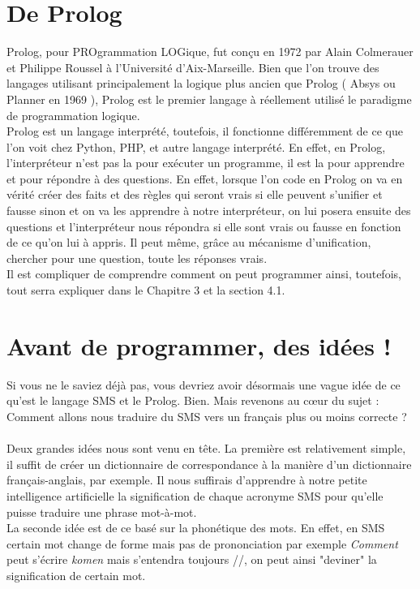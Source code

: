 \documentclass[11pt]{book}
\begin{document}
	\section{De Prolog}
	Prolog, pour PROgrammation LOGique, fut conçu en 1972 par Alain Colmerauer et Philippe Roussel à l'Université d'Aix-Marseille. Bien que l'on trouve des langages utilisant principalement la logique plus ancien que Prolog ( Absys ou Planner en 1969 ), Prolog est le premier langage à réellement utilisé le paradigme de programmation logique.\\
	Prolog est un langage interprété, toutefois, il fonctionne différemment de ce que l'on voit chez Python, PHP, et autre langage interprété. En effet, en Prolog, l'interpréteur n'est pas la pour exécuter un programme, il est la pour apprendre et pour répondre à des questions. En effet, lorsque l'on code en Prolog on va en vérité créer des faits et des règles qui seront vrais si elle peuvent s'unifier et fausse sinon et on va les apprendre à notre interpréteur, on lui posera ensuite des questions et l'interpréteur nous répondra si elle sont vrais ou fausse en fonction de ce qu'on lui à appris. Il peut même, grâce au mécanisme d'unification, chercher pour une question, toute les réponses vrais.\\
	Il est compliquer de comprendre comment on peut programmer ainsi, toutefois, tout serra expliquer dans le Chapitre 3 et la section 4.1.
	
	\section{Avant de programmer, des idées !}
	Si vous ne le saviez déjà pas, vous devriez avoir désormais une vague idée de ce qu'est le langage SMS et le Prolog. Bien. Mais revenons au cœur du sujet : Comment allons nous traduire du SMS vers un français plus ou moins correcte ?
	\paragraph{}
	Deux grandes idées nous sont venu en tête. La première est relativement simple, il suffit de créer un dictionnaire de correspondance à la manière d'un dictionnaire français-anglais, par exemple. Il nous suffirais d'apprendre à notre petite intelligence artificielle la signification de chaque acronyme SMS pour qu'elle puisse traduire une phrase mot-à-mot.\\
	La seconde idée est de ce basé sur la phonétique des mots. En effet, en SMS certain mot change de forme mais pas de prononciation par exemple {\em Comment} peut s'écrire {\em komen} mais s'entendra toujours //, on peut ainsi "deviner" la signification de certain mot.
\end{document}
